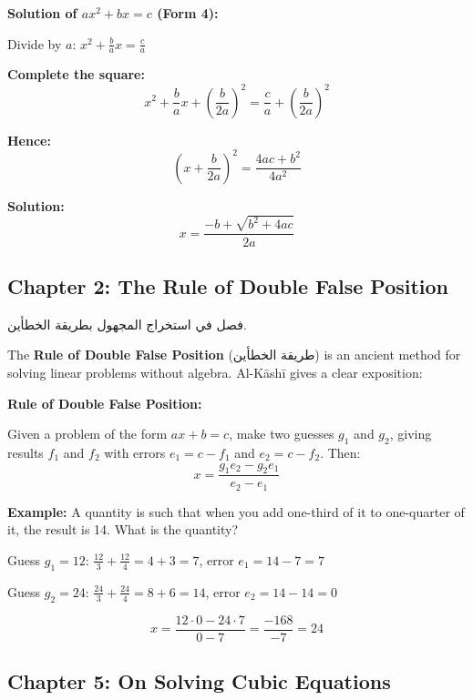\documentclass[11pt,a4paper]{article}
\newenvironment{arabicbox}{%
  \begin{framed}
  \begin{minipage}{\linewidth-2\fboxsep-2\fboxrule}
  \setlength{\parindent}{0pt}
  \linespread{1.3}\selectfont
}{%
  \end{minipage}
  \end{framed}
}
\newenvironment{mathalgo}{%
  \par\vspace{0.3cm}
  \begin{framed}
  \setlength{\parindent}{0pt}
}{%
  \end{framed}
  \par\vspace{0.3cm}
}
\newcommand{\ar}[1]{{\arabicfont\beginR #1\endR}}
\begin{document}
\begin{mathalgo}
\textbf{Solution of $ax^2 + bx = c$ (Form 4):}

Divide by $a$: $x^2 + \frac{b}{a}x = \frac{c}{a}$

\textbf{Complete the square:}
\[
x^2 + \frac{b}{a}x + \left(\frac{b}{2a}\right)^2 = \frac{c}{a} +
\left(\frac{b}{2a}\right)^2
\]

\textbf{Hence:}
\[
\left(x + \frac{b}{2a}\right)^2 = \frac{4ac + b^2}{4a^2}
\]

\textbf{Solution:}
\[
x = \frac{-b + \sqrt{b^2 + 4ac}}{2a}
\]
\end{mathalgo}

\subsection{Chapter 2: The Rule of Double False Position}

\begin{arabicbox}
\begin{Arabic}
فصل في استخراج المجهول بطريقة الخطأين.
\end{Arabic}
\end{arabicbox}

\vspace{0.3cm}

The \textbf{Rule of Double False Position} (\ar{طريقة الخطأين}) is an
ancient method for solving linear problems without algebra. Al-K\=ash\=i
gives a clear exposition:

\begin{mathalgo}
\textbf{Rule of Double False Position:}

Given a problem of the form $ax + b = c$, make two guesses $g_1$ and
$g_2$, giving results $f_1$ and $f_2$ with errors $e_1 = c - f_1$ and
$e_2 = c - f_2$. Then:
\[
x = \frac{g_1 e_2 - g_2 e_1}{e_2 - e_1}
\]

\textbf{Example:} A quantity is such that when you add one-third of it
  to one-quarter of it, the result is 14. What is the quantity?

Guess $g_1 = 12$: $\frac{12}{3} + \frac{12}{4} = 4 + 3 = 7$, error $e_1
= 14 - 7 = 7$

Guess $g_2 = 24$: $\frac{24}{3} + \frac{24}{4} = 8 + 6 = 14$, error $e_2
= 14 - 14 = 0$

\[
x = \frac{12 \cdot 0 - 24 \cdot 7}{0 - 7} = \frac{-168}{-7} = 24
\]
\end{mathalgo}

\subsection{Chapter 5: On Solving Cubic Equations}
\end{document}
